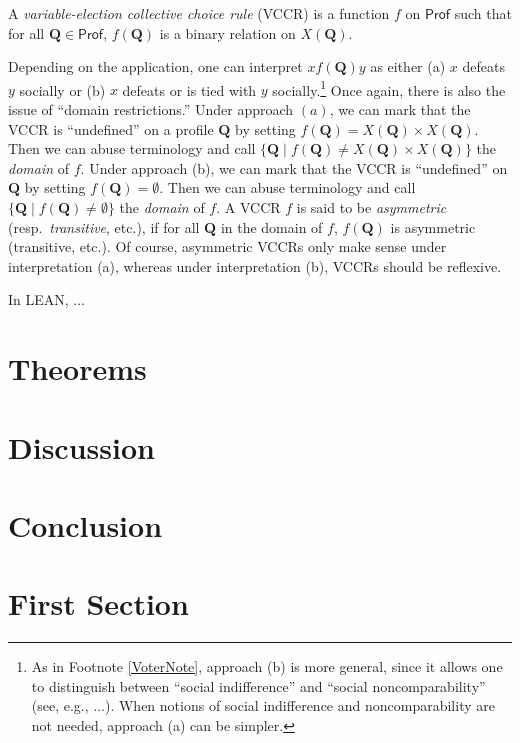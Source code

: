 \documentclass[runningheads]{llncs}
\begin{document}
\begin{definition} \textnormal{A \emph{variable-election collective choice rule} (VCCR) is a function $f$ on $\mathsf{Prof}$ such that for all $\mathbf{Q}\in\mathsf{Prof}$, $f(\mathbf{Q})$ is a binary relation on $X(\mathbf{Q})$.}
\end{definition}
Depending on the application, one can interpret $xf(\mathbf{Q})y$ as either (a) $x$ defeats $y$ socially or (b) $x$ defeats or is tied with $y$ socially.\footnote{As in Footnote \ref{VoterNote}, approach (b) is more general, since it allows one to distinguish between ``social indifference'' and ``social noncomparability'' (see, e.g., ...). When notions of social indifference and noncomparability are not needed, approach (a) can be simpler.} Once again, there is also the issue of ``domain restrictions.'' Under approach $(a)$, we can mark that the VCCR is ``undefined'' on a profile $\mathbf{Q}$ by setting $f(\mathbf{Q})= X(\mathbf{Q})\times X(\mathbf{Q})$. Then we can abuse terminology and call $\{\mathbf{Q}\mid f(\mathbf{Q})\neq X(\mathbf{Q})\times X(\mathbf{Q}) \}$ the \textit{domain} of $f$. Under approach (b), we can mark that the VCCR is ``undefined'' on $\mathbf{Q}$ by setting $f(\mathbf{Q})=\emptyset$. Then we can abuse terminology and call $\{\mathbf{Q}\mid f(\mathbf{Q})\neq \emptyset\}$ the \textit{domain} of $f$. A VCCR $f$ is said to be \textit{asymmetric} (resp.~\textit{transitive}, etc.), if for all $\mathbf{Q}$ in the domain of $f$, $f(\mathbf{Q})$ is asymmetric (transitive, etc.). Of course, asymmetric VCCRs only make sense under interpretation (a), whereas under interpretation (b), VCCRs should be reflexive.

In LEAN, ...

\section{Theorems}

\section{Discussion}

\section{Conclusion}




\newpage

\section{First Section}
\end{document}

